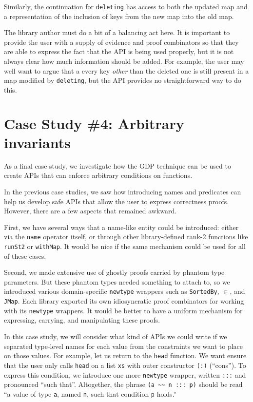 \documentclass[format=sigplan, review=false, screen=true]{acmart}
\begin{document}
Similarly, the continuation for \texttt{deleting} has access to both the updated map
and a representation of the inclusion of keys from the new map into the old map.

The library author must do a bit of a balancing act here. It is important to provide
the user with a supply of evidence and proof combinators so that they are able to
express the fact that the API is being used properly, but it is not always clear how
much information should be added. For example, the user may well want to argue that a
every key \emph{other} than the deleted one is still present in a map modified by
\texttt{deleting}, but the API provides no straightforward way to do this.

\section{Case Study \#4: Arbitrary invariants}\label{full-gdp}

As a final case study, we investigate how the GDP technique can be used to
create APIs that can enforce arbitrary conditions on functions.

In the previous case studies, we saw how introducing names and predicates can
help us develop safe APIs that allow the user to express correctness proofs.
However, there are a few aspects that remained awkward.

First, we have several
ways that a name-like entity could be introduced: either via the \texttt{name} operator
itself, or through other library-defined rank-2 functions like \texttt{runSt2} or \texttt{withMap}.
It would be nice if the same mechanism could be used for all of these cases.

Second, we made extensive use of ghostly proofs carried by phantom type parameters. But these
phantom types needed something to attach to, so we introduced various domain-specific \texttt{newtype}
wrappers such as \texttt{SortedBy}, \texttt{$\in$}, and \texttt{JMap}. Each library exported its own
idiosyncratic proof combinators for working with its \texttt{newtype} wrappers. It would be better to have
a uniform mechanism for expressing, carrying, and manipulating these proofs.

In this case study, we will consider what kind of APIs we could write if we separated
type-level names for each value from the constraints we want to place on those values.
For example, let us return to the \texttt{head} function. We want ensure that the
user only calls \texttt{head} on a list \texttt{xs} with outer constructor \texttt{(:)} (``cons'').
To express this condition, we introduce one more \texttt{newtype} wrapper,
written \texttt{:::} and pronounced ``such that''. Altogether, the phrase 
\verb|(a ~~ n ::: p)| should be read ``a value of type \texttt{a}, named \texttt{n}, such
that condition \texttt{p} holds.''
\end{document}
